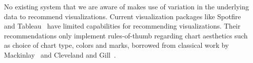 






No existing system that we are aware of makes use of variation in the underlying
data to recommend visualizations.  
Current visualization packages like Spotfire~\cite{Ahlberg:1996:SIE:245882.245893} and Tableau~\cite{tableau,polaris} have limited capabilities for 
recommending visualizations.
Their recommendations only implement rules-of-thumb 
regarding chart aesthetics such as choice of
chart type, colors and marks, borrowed from
classical work by Mackinlay~\cite{Mackinlay:1986:ADG:22949.22950} and Cleveland and Gill~\cite{cleveland1984graphical}.


